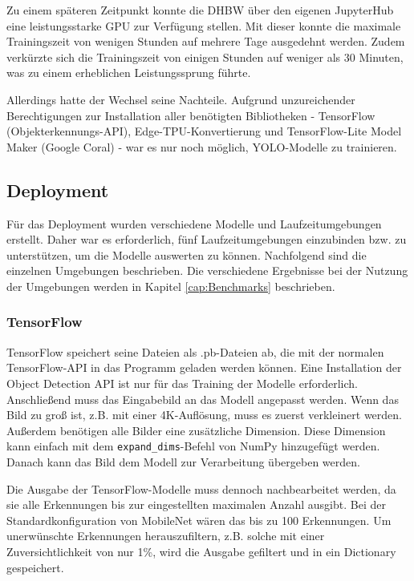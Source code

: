 Zu einem späteren Zeitpunkt konnte die DHBW über den eigenen JupyterHub eine leistungsstarke GPU zur Verfügung stellen. Mit dieser konnte die maximale Trainingszeit von wenigen Stunden auf mehrere Tage ausgedehnt werden. Zudem verkürzte sich die Trainingszeit von einigen Stunden auf weniger als 30 Minuten, was zu einem erheblichen Leistungssprung führte.

Allerdings hatte der Wechsel seine Nachteile. Aufgrund unzureichender Berechtigungen zur Installation aller benötigten Bibliotheken - TensorFlow (Objekterkennungs-API), Edge-TPU-Konvertierung und TensorFlow-Lite Model Maker (Google Coral) - war es nur noch möglich, \ac{YOLO}-Modelle zu trainieren.

\subsection{Deployment}

Für das Deployment wurden verschiedene Modelle und Laufzeitumgebungen erstellt. Daher war es erforderlich, fünf Laufzeitumgebungen einzubinden bzw. zu unterstützen, um die Modelle auswerten zu können. Nachfolgend sind die einzelnen Umgebungen beschrieben. Die verschiedene Ergebnisse bei der Nutzung der Umgebungen werden in Kapitel \ref{cap:Benchmarks} beschrieben.

\subsubsection{TensorFlow}

TensorFlow speichert seine Dateien als .pb-Dateien ab, die mit der normalen TensorFlow-API in das Programm geladen werden können. Eine Installation der Object Detection API ist nur für das Training der Modelle erforderlich.
\\
Anschließend muss das Eingabebild an das Modell angepasst werden. Wenn das Bild zu groß ist, z.B. mit einer 4K-Auflösung, muss es zuerst verkleinert werden. Außerdem benötigen alle Bilder eine zusätzliche Dimension. Diese Dimension kann einfach mit dem \verb|expand_dims|-Befehl von NumPy hinzugefügt werden.
\\
Danach kann das Bild dem Modell zur Verarbeitung übergeben werden. \cite{tens_zoo}

Die Ausgabe der TensorFlow-Modelle muss dennoch nachbearbeitet werden, da sie alle Erkennungen bis zur eingestellten maximalen Anzahl ausgibt. Bei der Standardkonfiguration von MobileNet wären das bis zu 100 Erkennungen. Um unerwünschte Erkennungen herauszufiltern, z.B. solche mit einer Zuversichtlichkeit von nur 1\%, wird die Ausgabe gefiltert und in ein Dictionary gespeichert.

